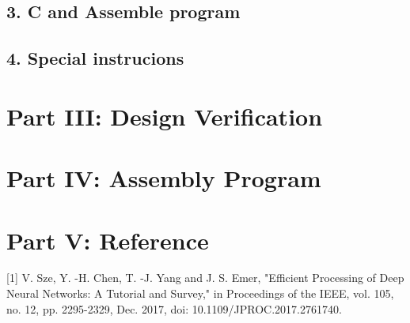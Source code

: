 \documentclass[12pt]{article}
\begin{document}
\subsection*{3. C and Assemble program}

\subsection*{4. Special instrucions}

     
\section*{Part III: Design Verification}

\section*{Part IV: Assembly Program}

\section*{Part V: Reference}
[1] V. Sze, Y. -H. Chen, T. -J. Yang and J. S. Emer, "Efficient Processing of Deep Neural Networks: A Tutorial and Survey," in Proceedings of the IEEE, vol. 105, no. 12, pp. 2295-2329, Dec. 2017, doi: 10.1109/JPROC.2017.2761740.
\end{document}
